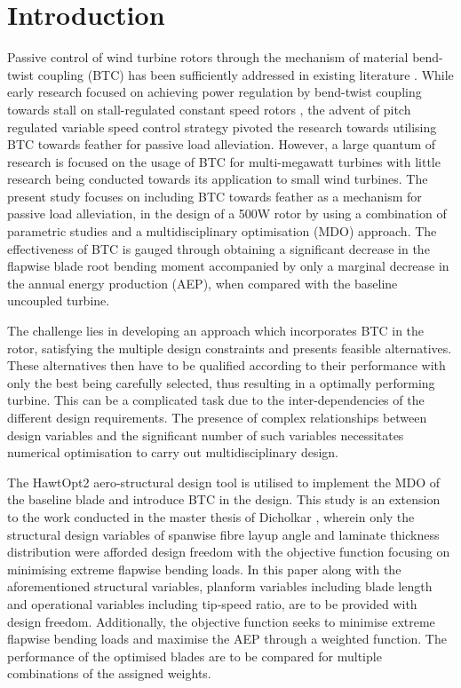 \documentclass[a4paper]{jpconf}
\begin{document}
\section{Introduction}
\label{sec:intro}
Passive control of wind turbine rotors through the mechanism of material bend-twist coupling (BTC) has been sufficiently addressed in existing literature \cite{veers1998aeroelastic}. %
While early research focused on achieving power regulation by bend-twist coupling towards stall on stall-regulated constant speed rotors 
, the advent of pitch regulated variable speed control strategy pivoted the research towards utilising BTC towards feather for passive load alleviation. %
However, a large quantum of research is focused on the usage of BTC for multi-megawatt turbines with little research being conducted towards its application to small wind turbines. The present study focuses on including BTC towards feather as a mechanism for passive load alleviation, in the design of a 500W rotor by using a combination of parametric studies and a multidisciplinary optimisation (MDO) approach. The effectiveness of BTC is gauged through obtaining a significant decrease in the flapwise blade root bending moment accompanied by only a marginal decrease in the annual energy production (AEP), when compared with the baseline uncoupled turbine.

The challenge lies in developing an approach which incorporates BTC in the rotor, satisfying the multiple design constraints and presents feasible alternatives. These alternatives then have to be qualified according to their performance with only the best being carefully selected, thus resulting in a optimally performing turbine. This can be a complicated task due to the inter-dependencies of the different design requirements. The presence of complex relationships between design variables and the significant number of such variables necessitates numerical optimisation to carry out multidisciplinary design.%

The HawtOpt2 \cite{zahle2016design} aero-structural design tool is utilised to implement the MDO of the baseline blade and introduce BTC in the design. This study is an extension to the work conducted in the master thesis of Dicholkar \cite{dicholkar2017numerical}, wherein only the structural design variables of spanwise fibre layup angle and laminate thickness distribution were afforded design freedom with the objective function focusing on minimising extreme flapwise bending loads. In this paper along with the aforementioned structural variables, planform variables including blade length and operational variables including tip-speed ratio, are to be provided with design freedom. Additionally, the objective function seeks to minimise extreme flapwise bending loads and maximise the AEP through a weighted function. The performance of the optimised blades are to be compared for multiple combinations of the assigned weights. 
\end{document}
